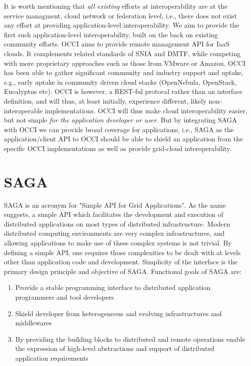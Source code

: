 \documentclass[10pt,conference,final,letterpaper,twoside,twocolumn,]{IEEEtran}
\begin{document}
It is worth mentioning that {\it all existing} efforts at
interoperability are at the service managment, cloud network or
federation level, i.e., there does not exist any effort at providing
application-level interoperability. We aim to provide the first such
application-level interoperability, built on the back on existing
community efforts.  OCCI aims to provide remote management API for
IaaS clouds. It complements related standards of SNIA and DMTF, while
competing with more proprietary approaches such as those from VMware
or Amazon.  OCCI has been able to gather significant community and
industry support and uptake, e.g., early uptake in community driven
cloud stacks (OpenNebula, OpenStack, Eucalyptus etc).  OCCI is
however, a REST-ful protocal rather than an interface definition, and
will thus, at least initially, experience different, likely
non-interoperable implementations.  OCCI will thus make cloud
interoperability easier, but not simple {\it for the application
  developer or user}.  But by integrating SAGA with OCCI we can
provide broad coverage for applications, i.e., SAGA as the
application/client API to OCCI should be able to shield an application
from the specific OCCI implementations as well as provide grid-cloud
interoperability.

\section{SAGA}

SAGA is an acronym for "Simple API for Grid Applications". As the name
suggests, a simple API which facilitates the development and execution
of distributed applications on most types of distributed
infrastructure.  Modern distributed computing environments are very
complex infrastructures, and allowing applications to make use of
these complex systems is not trivial.  By defining a simple API, one
requires those complexities to be dealt with at levels other than
application code and development.  Simplicity of the interface is the
primary design principle and objective of SAGA.  Functional goals of
SAGA are:


\begin{enumerate}

\item Provide a stable programming interface to distributed
   application programmers and tool developers
 
\item Shield developer from heterogeneous and evolving
   infrastructures and middlewares

\item By providing the building blocks to distributed and remote
   operations enable the expression of high-level abstractions
   and support of distributed application requirements

\end{enumerate}
\end{document}
